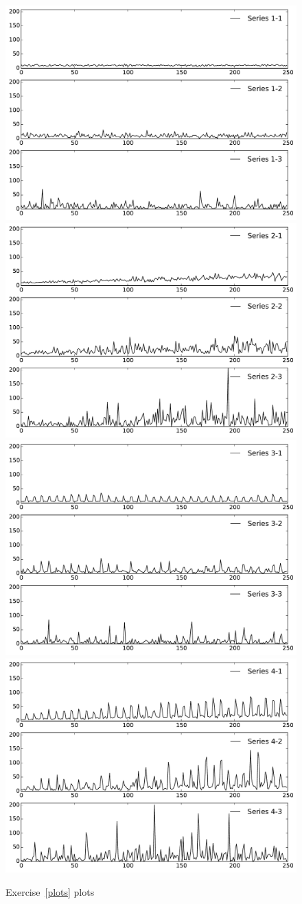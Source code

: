 \begin{landscape}
\begin{figure}
\centering
\includegraphics[width=.4\linewidth]{figures/Patterns_1.pdf}
\includegraphics[width=.4\linewidth]{figures/Patterns_2.pdf} \\
\includegraphics[width=.4\linewidth]{figures/Patterns_3.pdf}
\includegraphics[width=.4\linewidth]{figures/Patterns_4.pdf}
\caption{Exercise~\ref{plots} plots}
\label{fig:plots}
\end{figure}
\end{landscape}
\newpage

%





